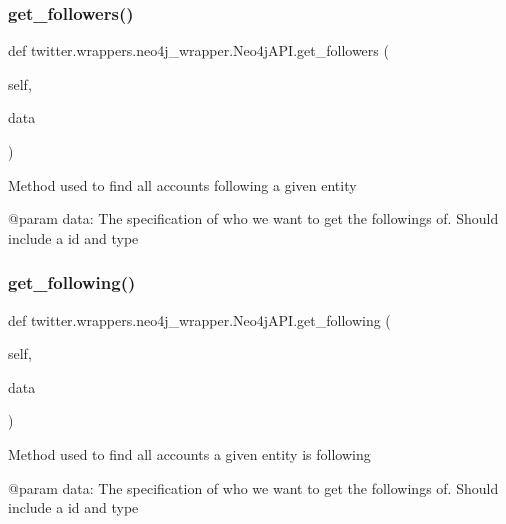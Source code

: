 \subsubsection{\texorpdfstring{get\+\_\+followers()}{get\_followers()}}
{\footnotesize\ttfamily def twitter.\+wrappers.\+neo4j\+\_\+wrapper.\+Neo4j\+A\+P\+I.\+get\+\_\+followers (\begin{DoxyParamCaption}\item[{}]{self,  }\item[{}]{data }\end{DoxyParamCaption})}

\begin{DoxyVerb}Method used to find all accounts following a given entity

@param data: The specification of who we want to get the followings of. Should include a id and type
\end{DoxyVerb}
 \mbox{\label{classtwitter_1_1wrappers_1_1neo4j__wrapper_1_1Neo4jAPI_afe328bc3bff856511ffe291bf6e94e8e}} 
\subsubsection{\texorpdfstring{get\+\_\+following()}{get\_following()}}
{\footnotesize\ttfamily def twitter.\+wrappers.\+neo4j\+\_\+wrapper.\+Neo4j\+A\+P\+I.\+get\+\_\+following (\begin{DoxyParamCaption}\item[{}]{self,  }\item[{}]{data }\end{DoxyParamCaption})}

\begin{DoxyVerb}Method used to find all accounts a given entity is following

@param data: The specification of who we want to get the followings of. Should include a id and type
\end{DoxyVerb}
 \mbox{\label{classtwitter_1_1wrappers_1_1neo4j__wrapper_1_1Neo4jAPI_a94d7463864ce54f396cef3b256825f60}} 
